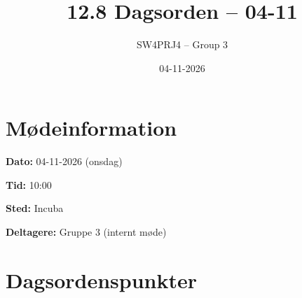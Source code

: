 \documentclass[a4paper,11pt]{article}
\title{12.8 Dagsorden -- 04-11}
\author{SW4PRJ4 -- Group 3}
\date{04-11-2026}
\begin{document}
\maketitle

\section*{Mødeinformation}

\textbf{Dato:} 04-11-2026 (onsdag)

\textbf{Tid:} 10:00

\textbf{Sted:} Incuba

\textbf{Deltagere:} Gruppe 3 (internt møde)

\section*{Dagsordenspunkter}
\end{document}
